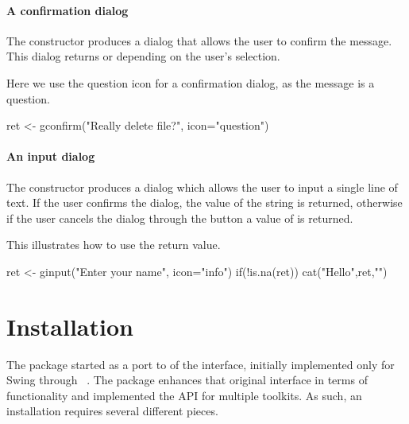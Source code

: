 \paragraph{A confirmation dialog}
The constructor  produces a dialog that allows
the user to confirm the message. This dialog returns  or
 depending on the user's selection.


Here we use the question icon for a confirmation dialog, as the message is a question.
\begin{Schunk}
\begin{Sinput}
 ret <- gconfirm("Really delete file?", icon="question")
\end{Sinput}
\end{Schunk}


\paragraph{An input dialog}
The  constructor produces a dialog which allows
the user to input a single line of text. If the user confirms the
dialog, the value of the string is returned, otherwise if the user
cancels the dialog through the button a value of  is returned.


This illustrates how to use the return value.
\begin{Schunk}
\begin{Sinput}
 ret <- ginput("Enter your name", icon="info")
 if(!is.na(ret)) 
   cat("Hello",ret,"\n")
\end{Sinput}
\end{Schunk}







\section{Installation}
\label{sec:installation}

The  package started as a port to  of the
 interface, initially implemented only for Swing through
~\citep{iWidgets}. The  package enhances that
original interface in terms of functionality and implemented the API
for multiple toolkits. As such, an installation requires several
different pieces.

